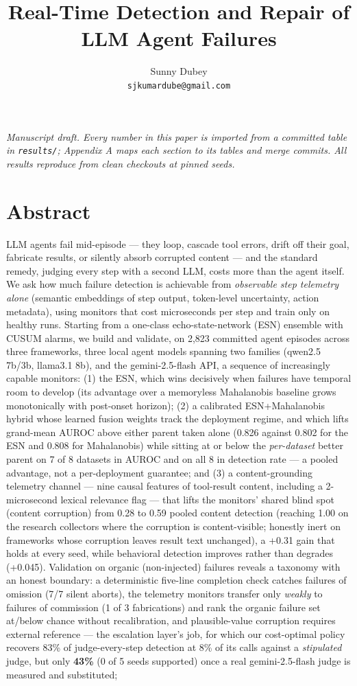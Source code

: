 \documentclass[11pt]{article}
\title{Real-Time Detection and Repair of LLM Agent Failures}
\author{Sunny Dubey \\ \texttt{sjkumardube@gmail.com}}
\date{}
\begin{document}
\maketitle

\emph{Manuscript draft. Every number in this paper is imported from a committed table in \texttt{results/\allowbreak{}}; Appendix A maps each section to its tables and merge commits. All results reproduce from clean checkouts at pinned seeds.}


\section{Abstract}


LLM agents fail mid-episode --- they loop, cascade tool errors, drift off their goal, fabricate results, or silently absorb corrupted content --- and the standard remedy, judging every step with a second LLM, costs more than the agent itself. We ask how much failure detection is achievable from \emph{observable step telemetry alone} (semantic embeddings of step output, token-level uncertainty, action metadata), using monitors that cost microseconds per step and train only on healthy runs. Starting from a one-class echo-state-network (ESN) ensemble with CUSUM alarms, we build and validate, on 2,823 committed agent episodes across three frameworks, three local agent models spanning two families (qwen2.5 7b/3b, llama3.1 8b), and the gemini-2.5-flash API, a sequence of increasingly capable monitors: (1) the ESN, which wins decisively when failures have temporal room to develop (its advantage over a memoryless Mahalanobis baseline grows monotonically with post-onset horizon); (2) a calibrated ESN+Mahalanobis hybrid whose learned fusion weights track the deployment regime, and which lifts grand-mean AUROC above either parent taken alone (0.826 against 0.802 for the ESN and 0.808 for Mahalanobis) while sitting at or below the \emph{per-dataset} better parent on 7 of 8 datasets in AUROC and on all 8 in detection rate --- a pooled advantage, not a per-deployment guarantee; and (3) a content-grounding telemetry channel --- nine causal features of tool-result content, including a 2-microsecond lexical relevance flag --- that lifts the monitors' shared blind spot (content corruption) from 0.28 to 0.59 pooled content detection (reaching 1.00 on the research collectors where the corruption is content-visible; honestly inert on frameworks whose corruption leaves result text unchanged), a +0.31 gain that holds at every seed, while behavioral detection improves rather than degrades (+0.045). Validation on organic (non-injected) failures reveals a taxonomy with an honest boundary: a deterministic five-line completion check catches failures of omission (7/7 silent aborts), the telemetry monitors transfer only \emph{weakly} to failures of commission (1 of 3 fabrications) and rank the organic failure set at/below chance without recalibration, and plausible-value corruption requires external reference --- the escalation layer's job, for which our cost-optimal policy recovers 83\% of judge-every-step detection at 8\% of its calls against a \emph{stipulated} judge, but only \textbf{43\%} (0 of 5 seeds supported) once a real gemini-2.5-flash judge is measured and substituted; 
\end{document}
